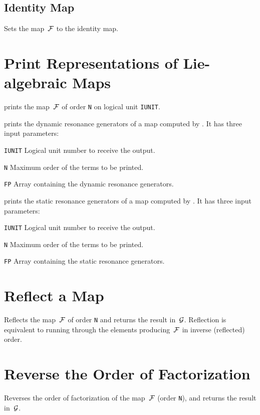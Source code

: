 \subsection{Identity Map}
\label{LMONE}
Sets the map~$\cal F$ to the identity map.
 
\section{Print Representations of Lie-algebraic Maps}
\label{LMPRNT}
prints the map~$\cal F$ of order {\tt N} on logical unit {\tt IUNIT}.

prints the dynamic resonance generators of a map computed by
. 
It has three input parameters:
\begin{mylist}
\item[\tt IUNIT]
Logical unit number to receive the output.
\item[\tt N]
Maximum order of the terms to be printed.
\item[\tt FP]
Array containing the dynamic resonance generators.
\end{mylist}

prints the static resonance generators of a map computed by
. 
It has three input parameters:
\begin{mylist}
\item[\tt IUNIT]
Logical unit number to receive the output.
\item[\tt N]
Maximum order of the terms to be printed.
\item[\tt FP]
Array containing the static resonance generators.
\end{mylist}
 
\section{Reflect a Map}
\label{LMREFL}
Reflects the map~$\cal F$ of order {\tt N} and returns the result
in~$\cal G$.
Reflection is equivalent to running through the elements
producing~$\cal F$ in inverse (reflected) order.
 
\section{Reverse the Order of Factorization}
\label{LMREVF}
Reverses the order of factorization of the map~$\cal F$ (order {\tt N}),
and returns the result in~$\cal G$.
 
